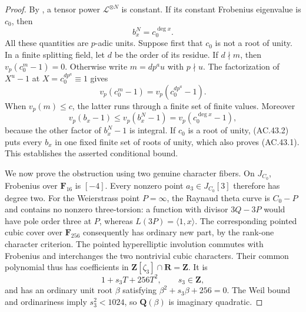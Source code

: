 \begin{proof}
By \cite[Proposition~8.6, p.~42]{AC_HartlPal2025}, a tensor power
$\mathcal L^{\otimes N}$ is constant. If its constant Frobenius
eigenvalue is $c_0$, then
\[
                         b_x^N=c_0^{\deg x}.           \tag{AC.43.2}
\]
All these quantities are $p$-adic units. Suppose first that $c_0$
is not a root of unity. In a finite splitting field, let $d$ be the
order of its residue. If $d\nmid m$, then
$v_p(c_0^m-1)=0$. Otherwise write $m=dp^a u$ with $p\nmid u$.
The factorization of $X^u-1$ at
$X=c_0^{dp^a}\equiv1$ gives
\[
 v_p(c_0^m-1)=v_p(c_0^{dp^a}-1).
\]
When $v_p(m)\le c$, the latter runs through a finite set of finite
values. Moreover
\[
 v_p(b_x-1)\le v_p(b_x^N-1)=v_p(c_0^{\deg x}-1),
\]
because the other factor of $b_x^N-1$ is integral. If $c_0$ is a
root of unity, (AC.43.2) puts every $b_x$ in one fixed finite set
of roots of unity, which also proves (AC.43.1). This establishes
the asserted conditional bound.

We now prove the obstruction using two genuine character fibers.
On $J_{C_0}$, Frobenius over $\mathbf F_{16}$ is $[-4]$.
Every nonzero point $a_3\in J_{C_0}[3]$ therefore has degree two.
For the Weierstrass point $P=\infty$, the Raynaud theta curve is
$C_0-P$ and contains no nonzero three-torsion: a function with
divisor $3Q-3P$ would have pole order three at $P$, whereas
$L(3P)=\langle1,x\rangle$. The corresponding pointed cubic
cover over $\mathbf F_{256}$ consequently has ordinary new part,
by the rank-one character criterion. The pointed hyperelliptic
involution commutes with Frobenius and interchanges the two
nontrivial cubic characters. Their common polynomial thus has
coefficients in
$\mathbf Z[\zeta_3]\cap\mathbf R=\mathbf Z$. It is
\[
                         1+s_3T+256T^2,
 \qquad s_3\in\mathbf Z,
\]
and has an ordinary unit root $\beta$ satisfying
$\beta^2+s_3\beta+256=0$. The Weil bound and ordinariness imply
$s_3^2<1024$, so $\mathbf Q(\beta)$ is imaginary quadratic.


\end{proof}
